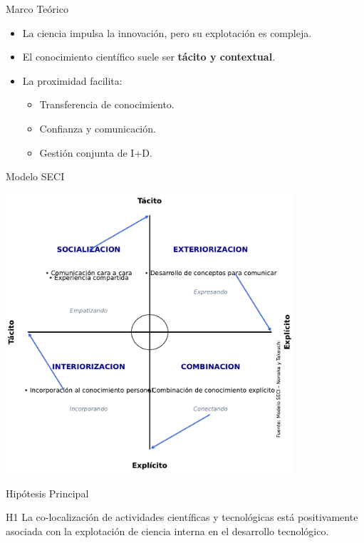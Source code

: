 \documentclass{beamer}
\begin{document}
	\begin{frame}{Marco Teórico}
		\begin{itemize}
			\item La ciencia impulsa la innovación, pero su explotación es compleja.
			\item El conocimiento científico suele ser \textbf{tácito y contextual}.
			\item La proximidad facilita:
			\begin{itemize}
				\item Transferencia de conocimiento.
				\item Confianza y comunicación.
				\item Gestión conjunta de I+D.
			\end{itemize}
		\end{itemize}
	\end{frame}
	\begin{frame}{Modelo SECI}
		\centering
		\begin{minipage}{0.85\textwidth}
			\includegraphics[width=0.8\textwidth]{./figs/Nonaka.pdf}
		\end{minipage}%
		\begin{minipage}{0.05\textwidth}
			\centering
		\end{minipage}
	\end{frame}
	
	\begin{frame}{Hipótesis Principal}
		\begin{block}{H1}
			La co-localización de actividades científicas y tecnológicas está positivamente asociada con la explotación de ciencia interna en el desarrollo tecnológico.
		\end{block}
	\end{frame}
	
\end{document}
